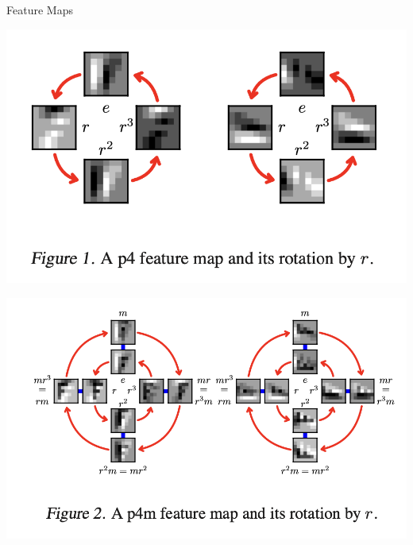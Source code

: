 \documentclass{beamer}
\begin{document}
\begin{frame}{Feature Maps}
    \begin{minipage}{0.5\textwidth}
        \includegraphics[width=\linewidth]{Screenshot 2024-01-13 at 11.28.41 AM.png} %
    \end{minipage}%
    \begin{minipage}{0.5\textwidth}
        \includegraphics[width=\linewidth]{Screenshot 2024-01-13 at 11.28.51 AM.png} %
    \end{minipage}
\end{frame}
\end{document}
